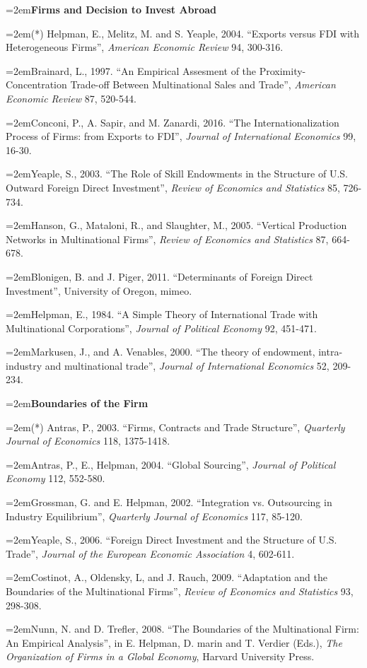 \documentclass[10pt]{article}
\newcommand{\reading}{\par\hangindent=2em\hangafter=1\noindent}
\newenvironment{readingsblock}{%
  \begin{adjustwidth}{2em}{0pt} %
}{%
  \end{adjustwidth}
}
\begin{document}
  \begin{readingsblock}
  
  \reading \textbf{Firms and Decision to Invest Abroad} \\[4pt]
  
  \reading (*) Helpman, E., Melitz, M. and S. Yeaple, 2004. “Exports versus FDI with Heterogeneous Firms”, {\it American Economic Review} 94, 300-316.
  \reading Brainard, L., 1997. “An Empirical Assesment of the Proximity-Concentration Trade-off Between Multinational Sales and Trade”, {\it American Economic Review} 87, 520-544.
  \reading Conconi, P., A. Sapir, and M. Zanardi, 2016. “The Internationalization Process of Firms: from Exports to FDI”, {\it Journal of International Economics} 99, 16-30.
  \reading Yeaple, S., 2003. “The Role of Skill Endowments in the Structure of U.S. Outward Foreign Direct Investment”, {\it Review of Economics and Statistics} 85, 726-734.
  \reading Hanson, G., Mataloni, R., and Slaughter, M., 2005. “Vertical Production Networks in Multinational Firms”, {\it Review of Economics and Statistics} 87, 664-678.
  \reading Blonigen, B. and J. Piger, 2011. “Determinants of Foreign Direct Investment”, University of Oregon, mimeo.
  \reading Helpman, E., 1984. “A Simple Theory of International Trade with Multinational Corporations”, {\it Journal of Political Economy} 92, 451-471.
  \reading Markusen, J., and A. Venables, 2000. “The theory of endowment, intra-industry and multinational trade”, {\it Journal of International Economics} 52, 209-234. \\[4pt]
  
  
  \reading \textbf{Boundaries of the Firm} \\[4pt]
  
  \reading (*) Antras, P., 2003. “Firms, Contracts and Trade Structure”, {\it Quarterly Journal of Economics} 118, 1375-1418.
  \reading Antras, P., E., Helpman, 2004. “Global Sourcing”, {\it Journal of Political Economy} 112, 552-580.
  \reading Grossman, G. and E. Helpman, 2002. “Integration vs. Outsourcing in Industry Equilibrium”, {\it Quarterly Journal of Economics} 117, 85-120.
  \reading Yeaple, S., 2006. “Foreign Direct Investment and the Structure of U.S. Trade”, {\it Journal of the European Economic Association} 4, 602-611.
  \reading Costinot, A., Oldensky, L, and J. Rauch, 2009. “Adaptation and the Boundaries of the Multinational Firms”, {\it Review of Economics and Statistics} 93, 298-308.
  \reading Nunn, N. and D. Trefler, 2008. “The Boundaries of the Multinational Firm: An Empirical Analysis”, in E. Helpman, D. marin and T. Verdier (Eds.), {\it The Organization of Firms in a Global Economy}, Harvard University Press. \\[4pt]
  

\end{readingsblock}
\end{document}
